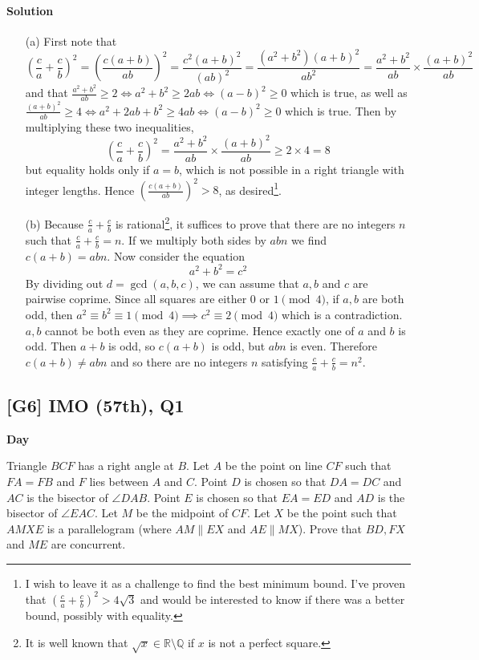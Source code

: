 \documentclass[10pt]{article}
\newcommand{\themonth}{March}
\newcommand{\theyear}{2019}
\newcounter{day}
\newcounter{solution}
\newcounter{datenumber}
\newcommand{\problem}[4][0]{
	\newpage
	\subsection{[#3] \space #2} \hfill 
	{\large\textbf{Day \arabic{day}}} %
	\begin{flushleft} #4 \end{flushleft}
	\vspace{1em}
	\addtocounter{day}{1}
	\addtocounter{datenumber}{1}
	\setcounter{solution}{1}
}
\newcommand{\anonsolution}[2][0]{
	\paragraph{Solution \arabic{solution}} 
	\begin{flushleft} #2 \end{flushleft}
	\addtocounter{solution}{1}
	\vspace{1em}
}
\begin{document}
\anonsolution[27]{\begin{enumerate} \item[(a)] First note that \[\left(\frac{c}{a}+\frac{c}{b}\right)^2 = \left(\frac{c(a+b)}{ab} \right)^2 = \frac{c^2(a+b)^2}{(ab)^2}=\frac{(a^2+b^2)(a+b)^2}{ab^2} = \frac{a^2+b^2}{ab}\times \frac{(a+b)^2}{ab}\] and that \(\frac{a^2+b^2}{ab}\geq 2 \iff a^2+b^2\geq 2ab \iff (a-b)^2\geq 0\) which is true, as well as \(\frac{(a+b)^2}{ab}\geq 4 \iff a^2+2ab+b^2 \geq 4ab \iff (a-b)^2\geq 0\) which is true. Then by multiplying these two inequalities, \[\left(\frac{c}{a}+\frac{c}{b}\right)^2= \frac{a^2+b^2}{ab}\times \frac{(a+b)^2}{ab} \geq 2\times 4=8\] but equality holds only if \(a=b\), which is not possible in a right triangle with integer lengths. Hence \(\left(\frac{c(a+b)}{ab} \right)^2 >8\), as desired\footnote{I wish to leave it as a challenge to find the best minimum bound. I've proven that \( \left(\frac{c}{a}+\frac{c}{b}\right)^2>4\sqrt{3}\) and would be interested to know if there was a better bound, possibly with equality.}. \item[(b)] Because \(\frac{c}{a}+\frac{c}{b}\) is rational\footnote{It is well known that \(\sqrt{x}\in \mathbb{R}\setminus \mathbb{Q}\) if \(x\) is not a perfect square.}, it suffices to prove that there are no integers \(n\) such that \(\frac{c}{a}+\frac{c}{b}=n\). If we multiply both sides by \(abn\) we find \(c(a+b)=abn\). Now consider the equation \[a^2+b^2=c^2\] By dividing out \(d=\gcd(a,b,c)\), we can assume that \(a,b\) and \(c\) are pairwise coprime. Since all squares are either \(0\) or \(1\pmod 4\), if \(a,b\) are both odd, then \(a^2\equiv b^2\equiv 1\pmod 4 \implies c^2\equiv 2 \pmod 4\) which is a contradiction. \(a,b\) cannot be both even as they are coprime. Hence exactly one of \(a\) and \(b\) is odd. Then \(a+b\) is odd, so \(c(a+b)\) is odd, but \(abn\) is even. Therefore \(c(a+b)\neq abn\) and so there are no integers \(n\) satisfying \(\frac{c}{a}+\frac{c}{b}=n^2\). \end{enumerate}}

\problem[28]{2016 IMO (57th), Q1}{G6}{Triangle $BCF$ has a right angle at $B$. Let $A$ be the point on line $CF$ such that $FA=FB$ and $F$ lies between $A$ and $C$. Point $D$ is chosen so that $DA=DC$ and $AC$ is the bisector of $\angle{DAB}$. Point $E$ is chosen so that $EA=ED$ and $AD$ is the bisector of $\angle{EAC}$. Let $M$ be the midpoint of $CF$. Let $X$ be the point such that $AMXE$ is a parallelogram (where $AM \parallel EX$ and $AE \parallel MX$). Prove that $BD,FX$ and $ME$ are concurrent.}
\end{document}
